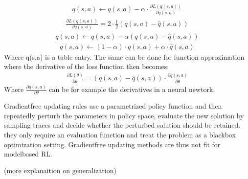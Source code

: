 \documentclass[letterpaper,10pt,english]{jupyterBook}
\begin{document}
\begin{equation*}
\begin{split} q(s,a) \leftarrow q(s,a) - \alpha \cdot \frac{\partial L(q(s,a))}{\partial q(s,a)} \end{split}
\end{equation*}\begin{equation*}
\begin{split} \frac{\partial L(q(s,a))}{\partial q(s,a)} = 2 \cdot \frac{1}{2}(q(s,a) - \hat{q}(s,a)) \end{split}
\end{equation*}\begin{equation*}
\begin{split} q(s,a) \leftarrow q(s,a) - \alpha(q(s,a) - \hat{q}(s,a)) \end{split}
\end{equation*}\begin{equation*}
\begin{split} q(s,a) \leftarrow (1- \alpha) \cdot q(s,a) + \alpha \cdot \hat{q}(s,a)  \end{split}
\end{equation*}
\sphinxAtStartPar
Where q(s,a) is a table entry. The same can be done for function approximation where the derivative of the loss function then becomes:
\begin{equation*}
\begin{split} \frac{\partial L(\theta)}{\partial \theta} = (q(s,a) - \hat{q}(s,a)) \cdot \frac{\partial q(s,a)}{\partial \theta} \end{split}
\end{equation*}
\sphinxAtStartPar
Where \(\frac{\partial q(s,a)}{\partial \theta}\) can be for example the derivatives in a neural newtork.

\sphinxAtStartPar
Gradient\sphinxhyphen{}free updating rules use a parametrized policy function and then repeatedly perturb the parameters in policy space, evaluate the new solution by sampling traces and decide whether the perturbed solution should be retained. they only require an evaluation function and treat the problem as a black\sphinxhyphen{}box optimization setting. Gradient\sphinxhyphen{}free updating methods are thus not fit for model\sphinxhyphen{}based RL.

\sphinxAtStartPar
(more explanaition on generalization)
\end{document}
